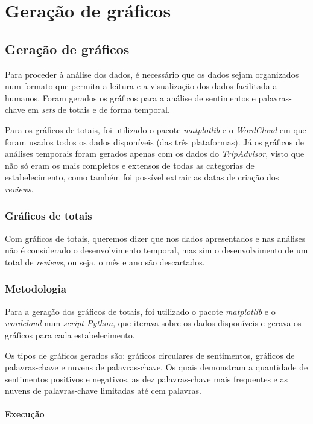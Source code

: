 \chapter{Geração de gráficos}
\label{cap7}

\section{Geração de gráficos}

Para proceder à análise dos dados, é necessário que os dados sejam organizados num formato que permita a leitura e a visualização dos dados facilitada a humanos. Foram gerados os gráficos para a análise de sentimentos e palavras-chave em \textit{sets} de totais e de forma temporal.

Para os gráficos de totais, foi utilizado o pacote \textit{matplotlib} e o \textit{WordCloud} em que foram usados todos os dados disponíveis (das três plataformas). Já os gráficos de análises temporais foram gerados apenas com os dados do \textit{TripAdvisor}, visto que não só eram os mais completos e extensos de todas as categorias de estabelecimento, como também foi possível extrair as datas de criação dos \textit{reviews}.

\subsection{Gráficos de totais}

Com gráficos de totais, queremos dizer que nos dados apresentados e nas análises não é considerado o desenvolvimento temporal, mas sim o desenvolvimento de um total de \textit{reviews}, ou seja, o mês e ano são descartados.

\subsection{Metodologia}

Para a geração dos gráficos de totais, foi utilizado o pacote \textit{matplotlib} e o \textit{wordcloud} num \textit{script Python}, que iterava sobre os dados disponíveis e gerava os gráficos para cada estabelecimento.

Os tipos de gráficos gerados são: gráficos circulares de sentimentos, gráficos de palavras-chave e nuvens de palavras-chave. Os quais demonstram a quantidade de sentimentos positivos e negativos, as dez palavras-chave mais frequentes e as nuvens de palavras-chave limitadas até cem palavras.

\subsubsection{Execução}

